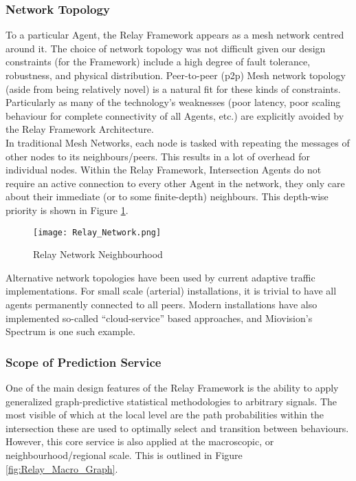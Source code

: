 \documentclass{article}
\begin{document}
\subsubsection{Network Topology}

To a particular Agent, the Relay Framework appears as a mesh network centred around it.
The choice of network topology was not difficult given our design constraints (for the Framework) include a high degree of fault tolerance, robustness, and physical distribution.
Peer-to-peer (p2p) Mesh network topology (aside from being relatively novel) is a natural fit for these kinds of constraints.
Particularly as many of the technology's weaknesses (poor latency, poor scaling behaviour for complete connectivity of all Agents, etc.) are explicitly avoided by the Relay Framework Architecture.\\

In traditional Mesh Networks, each node is tasked with repeating the messages of other nodes to its neighbours/peers.
This results in a lot of overhead for individual nodes.
Within the Relay Framework, Intersection Agents do not require an active connection to every other Agent in the network, they only care about their immediate (or to some finite-depth) neighbours.
This depth-wise priority is shown in Figure \ref{fig:Relay_Network}.\\

\begin{figure}[!htpb]
	\caption{Relay Network Neighbourhood}
	\texttt{[image: Relay\_Network.png]}
	\label{fig:Relay_Network}
\end{figure}

Alternative network topologies have been used by current adaptive traffic implementations.
For small scale (arterial) installations, it is trivial to have all agents permanently connected to all peers.
Modern installations have also implemented so-called ``cloud-service'' based approaches, and Miovision's Spectrum is one such example.\\

\subsubsection{Scope of Prediction Service}

One of the main design features of the Relay Framework is the ability to apply generalized graph-predictive statistical methodologies to arbitrary signals.
The most visible of which at the local level are the path probabilities within the intersection these are used to optimally select and transition between behaviours.
However, this core service is also applied at the macroscopic, or neighbourhood/regional scale.
This is outlined in Figure \ref{fig:Relay_Macro_Graph}.\\
\end{document}
